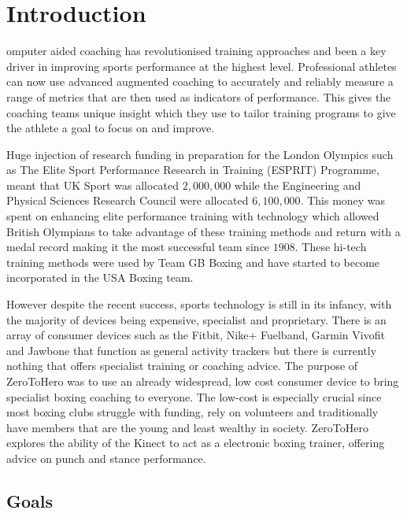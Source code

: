 %
%
\let\textcircled=\pgftextcircled
\chapter{Introduction}
\label{chap:intro}

omputer aided coaching has revolutionised training approaches and been a key driver in improving sports performance at the highest level. Professional athletes can now use advanced augmented coaching to accurately and reliably measure a range of metrics that are then used as indicators of performance.\cite{aug0} This gives the coaching teams unique insight which they use to tailor training programs to give the athlete a goal to focus on and improve.

Huge injection of research funding in preparation for the London Olympics such as The Elite Sport Performance Research in Training (ESPRIT) Programme, meant that UK Sport was allocated \textsterling $2,000,000$  while the Engineering and Physical Sciences Research Council were allocated \textsterling $6,100,000$.\cite{aug5} This money was spent on enhancing elite performance training with technology \cite{aug3} \cite{aug4} which allowed British Olympians to take advantage of these training methods and return with a medal record making it the most successful team since $1908$.\cite{olymp1} These hi-tech training methods were used by Team GB Boxing \cite{aug2} and have started to become incorporated in the USA Boxing team.\cite{aug1}

However despite the recent success, sports technology is still in its infancy, with the majority of devices being expensive, specialist and proprietary\cite{aug7}. There is an array of consumer devices such as the Fitbit, Nike+ Fuelband, Garmin Vivofit and Jawbone that function as general activity trackers but there is currently nothing that offers specialist training or coaching advice. The purpose of ZeroToHero was to use an already widespread, low cost consumer device to bring specialist boxing coaching to everyone. The low-cost is especially crucial since most boxing clubs struggle with funding, rely on volunteers and traditionally have members that are the young and least wealthy in society. ZeroToHero explores the ability of the Kinect to act as a electronic boxing trainer, offering advice on punch and stance performance.
\section{Goals}
\label{sec:sec01}


